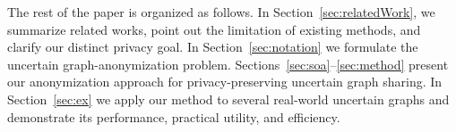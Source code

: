

The rest of the paper is organized as follows. In Section~\ref{sec:relatedWork}, we summarize related works, point out the limitation of existing methods, and clarify our distinct privacy goal. In Section~\ref{sec:notation} we formulate the uncertain graph-anonymization problem. Sections~\ref{sec:soa}--\ref{sec:method} present our anonymization approach for privacy-preserving uncertain graph sharing.  In Section~\ref{sec:ex} we apply our method to several real-world uncertain graphs and demonstrate its performance, practical utility, and efficiency. 